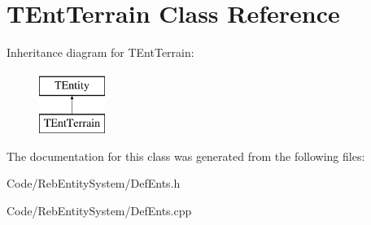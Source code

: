 \hypertarget{class_t_ent_terrain}{}\section{T\+Ent\+Terrain Class Reference}
\label{class_t_ent_terrain}
Inheritance diagram for T\+Ent\+Terrain\+:\begin{figure}[H]
\begin{center}
\leavevmode
\includegraphics[height=2.000000cm]{class_t_ent_terrain}
\end{center}
\end{figure}


The documentation for this class was generated from the following files\+:\begin{DoxyCompactItemize}
\item 
Code/\+Reb\+Entity\+System/Def\+Ents.\+h\item 
Code/\+Reb\+Entity\+System/Def\+Ents.\+cpp\end{DoxyCompactItemize}
